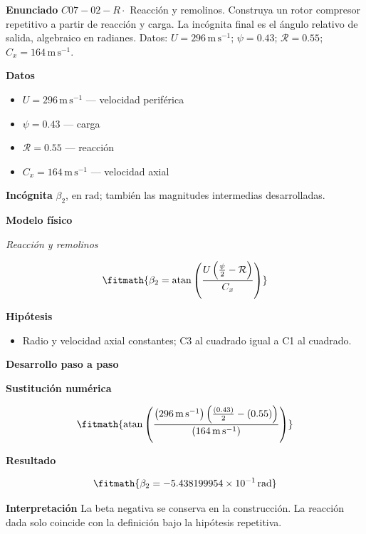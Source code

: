 \documentclass[10pt,openany]{book}
\begin{document}
\begin{tcolorbox}[title={Problema resuelto 2}, studiumworked, breakable]

\noindent\textbf{Enunciado}
\(C07-02-R \cdot\) Reacción y remolinos. Construya un rotor compresor repetitivo a partir de reacción y carga. La incógnita final es el ángulo relativo de salida, algebraico en radianes. Datos: \(U=296\, \mathrm{m}\,\mathrm{s}^{-1}\); \(\psi=0.43\); \(\mathcal R=0.55\); \(C_x=164\, \mathrm{m}\,\mathrm{s}^{-1}\).

\noindent\textbf{Datos}
\begin{itemize}
\item $U = 296\,\mathrm{m}\,\mathrm{s}^{-1}$ — velocidad periférica
\item $\psi = 0.43$ — carga
\item $\mathcal R = 0.55$ — reacción
\item $C_x = 164\,\mathrm{m}\,\mathrm{s}^{-1}$ — velocidad axial
\end{itemize}

\noindent\textbf{Incógnita}
$\beta_2$, en $\mathrm{rad}$; también las magnitudes intermedias desarrolladas.

\noindent\textbf{Modelo físico}

\noindent\textit{Reacción y remolinos}

\[
\fitmath{\beta_2=\operatorname{atan}{\left(\frac{U \left(\frac{\psi}{2} - \mathcal R\right)}{C_x} \right)}}
\]

\noindent\textbf{Hipótesis}
\begin{itemize}
\item Radio y velocidad axial constantes; C3 al cuadrado igual a C1 al cuadrado.
\end{itemize}

\noindent\textbf{Desarrollo paso a paso}



\noindent\textbf{Sustitución numérica}

\[
\fitmath{\operatorname{atan}{\left(\frac{\left(296\,\mathrm{m}\,\mathrm{s}^{-1}\right) \left(\frac{\left(0.43\right)}{2} - \left(0.55\right)\right)}{\left(164\,\mathrm{m}\,\mathrm{s}^{-1}\right)} \right)}}
\]

\noindent\textbf{Resultado}

\[
\fitmath{\beta_2=-5.438199954\times10^{-1}\,\mathrm{rad}}
\]

\noindent\textbf{Interpretación}
La beta negativa se conserva en la construcción. La reacción dada solo coincide con la definición bajo la hipótesis repetitiva.


\end{tcolorbox}
\end{document}
